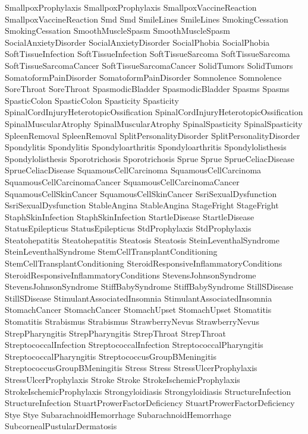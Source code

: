  SmallpoxProphylaxis
 SmallpoxProphylaxis
 SmallpoxVaccineReaction
 SmallpoxVaccineReaction
 Smd
 Smd
 SmileLines
 SmileLines
 SmokingCessation
 SmokingCessation
 SmoothMuscleSpasm
 SmoothMuscleSpasm
 SocialAnxietyDisorder
 SocialAnxietyDisorder
 SocialPhobia
 SocialPhobia
 SoftTissueInfection
 SoftTissueInfection
 SoftTissueSarcoma
 SoftTissueSarcoma
 SoftTissueSarcomaCancer
 SoftTissueSarcomaCancer
 SolidTumors
 SolidTumors
 SomatoformPainDisorder
 SomatoformPainDisorder
 Somnolence
 Somnolence
 SoreThroat
 SoreThroat
 SpasmodicBladder
 SpasmodicBladder
 Spasms
 Spasms
 SpasticColon
 SpasticColon
 Spasticity
 Spasticity
 SpinalCordInjuryHeterotopicOssification
 SpinalCordInjuryHeterotopicOssification
 SpinalMuscularAtrophy
 SpinalMuscularAtrophy
 SpinalSpasticity
 SpinalSpasticity
 SpleenRemoval
 SpleenRemoval
 SplitPersonalityDisorder
 SplitPersonalityDisorder
 Spondylitis
 Spondylitis
 Spondyloarthritis
 Spondyloarthritis
 Spondylolisthesis
 Spondylolisthesis
 Sporotrichosis
 Sporotrichosis
 Sprue
 Sprue
 SprueCeliacDisease
 SprueCeliacDisease
 SquamousCellCarcinoma
 SquamousCellCarcinoma
 SquamousCellCarcinomaCancer
 SquamousCellCarcinomaCancer
 SquamousCellSkinCancer
 SquamousCellSkinCancer
 SsriSexualDysfunction
 SsriSexualDysfunction
 StableAngina
 StableAngina
 StageFright
 StageFright
 StaphSkinInfection
 StaphSkinInfection
 StartleDisease
 StartleDisease
 StatusEpilepticus
 StatusEpilepticus
 StdProphylaxis
 StdProphylaxis
 Steatohepatitis
 Steatohepatitis
 Steatosis
 Steatosis
 SteinLeventhalSyndrome
 SteinLeventhalSyndrome
 StemCellTransplantConditioning
 StemCellTransplantConditioning
 SteroidResponsiveInflammatoryConditions
 SteroidResponsiveInflammatoryConditions
 StevensJohnsonSyndrome
 StevensJohnsonSyndrome
 StiffBabySyndrome
 StiffBabySyndrome
 StillSDisease
 StillSDisease
 StimulantAssociatedInsomnia
 StimulantAssociatedInsomnia
 StomachCancer
 StomachCancer
 StomachUpset
 StomachUpset
 Stomatitis
 Stomatitis
 Strabismus
 Strabismus
 StrawberryNevus
 StrawberryNevus
 StrepPharyngitis
 StrepPharyngitis
 StrepThroat
 StrepThroat
 StreptococcalInfection
 StreptococcalInfection
 StreptococcalPharyngitis
 StreptococcalPharyngitis
 StreptococcusGroupBMeningitis
 StreptococcusGroupBMeningitis
 Stress
 Stress
 StressUlcerProphylaxis
 StressUlcerProphylaxis
 Stroke
 Stroke
 StrokeIschemicProphylaxis
 StrokeIschemicProphylaxis
 Strongyloidiasis
 Strongyloidiasis
 StructureInfection
 StructureInfection
 StuartProwerFactorDeficiency
 StuartProwerFactorDeficiency
 Stye
 Stye
 SubarachnoidHemorrhage
 SubarachnoidHemorrhage
 SubcornealPustularDermatosis
